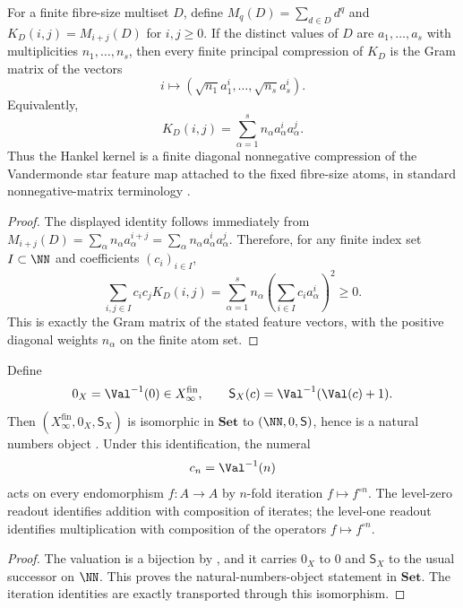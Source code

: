 \begin{proposition}
\label{thm:star-kernel}
For a finite fibre-size multiset \(D\), define
\(M_q(D)=\sum_{d\in D}d^q\) and \(K_D(i,j)=M_{i+j}(D)\) for \(i,j\ge0\).  If the
distinct values of \(D\) are \(a_1,\ldots,a_s\) with multiplicities
\(n_1,\ldots,n_s\), then every finite principal compression of \(K_D\) is the
Gram matrix of the vectors
\[
  i\longmapsto (\sqrt{n_1}a_1^i,\ldots,\sqrt{n_s}a_s^i).
\]
Equivalently,
\[
  K_D(i,j)=\sum_{\alpha=1}^s n_\alpha a_\alpha^i a_\alpha^j .
\]
Thus the Hankel kernel is a finite diagonal nonnegative compression of the
Vandermonde star feature map attached to the fixed fibre-size atoms, in standard
nonnegative-matrix terminology \cite{BermanPlemmons1994}.
\end{proposition}

\begin{proof}
The displayed identity follows immediately from
\(M_{i+j}(D)=\sum_\alpha n_\alpha a_\alpha^{i+j}
=\sum_\alpha n_\alpha a_\alpha^i a_\alpha^j\).  Therefore, for any finite index
set \(I\subset\NN\) and coefficients \((c_i)_{i\in I}\),
\[
  \sum_{i,j\in I}c_i c_jK_D(i,j)
  =\sum_{\alpha=1}^s n_\alpha\left(\sum_{i\in I}c_i a_\alpha^i\right)^2\ge0.
\]
This is exactly the Gram matrix of the stated feature vectors, with the positive
diagonal weights \(n_\alpha\) on the finite atom set.
\end{proof}

\begin{proposition}
\label{prop:nno}
Define
\[
  0_X=\Val^{-1}(0)\in X_{\infty}^{\mathrm{fin}},\qquad
  \mathsf S_X(c)=\Val^{-1}(\Val(c)+1).
\]
Then \((X_{\infty}^{\mathrm{fin}},0_X,\mathsf S_X)\) is
isomorphic in \(\mathbf{Set}\) to
\((\NN,0,\mathsf S)\), hence is a natural numbers object
\cite{Lawvere1964}.  Under this identification, the numeral
\[
  c_n=\Val^{-1}(n)
\]
acts on every endomorphism \(f\colon A\to A\) by \(n\)-fold
iteration \(f\mapsto f^{\circ n}\).  The level-zero readout
identifies addition with composition of iterates; the level-one
readout identifies multiplication with composition of the operators
\(f\mapsto f^{\circ n}\).
\end{proposition}

\begin{proof}
The valuation is a bijection by , and it
carries \(0_X\) to \(0\) and \(\mathsf S_X\) to the usual successor
on \(\NN\).  This proves the natural-numbers-object statement in
\(\mathbf{Set}\).  The iteration identities are exactly
 transported through this isomorphism.
\end{proof}
